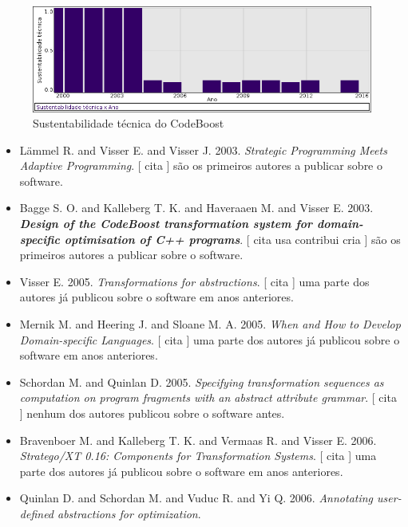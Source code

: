 \begin{figure}[h]
  \center
  \includegraphics[scale=0.50]{result-documents/charts/codeboost.png}
  \caption{Sustentabilidade técnica do CodeBoost}
\end{figure}


\begin{itemize}
\item L\"{a}mmel R. and Visser E. and Visser J.
      2003.
        \textit{ Strategic Programming Meets Adaptive Programming}.
      [
          cita
      ]
são os primeiros autores a publicar sobre o software.
\item Bagge S. O. and Kalleberg T. K. and Haveraaen M. and Visser E.
      2003.
        \textbf{\textit{ Design of the CodeBoost transformation system for domain-specific optimisation of C++ programs}}.
      [
          cita
          usa
          contribui
          cria
      ]
são os primeiros autores a publicar sobre o software.
\item Visser E.
      2005.
        \textit{ Transformations for abstractions}.
      [
          cita
      ]
uma parte dos autores já publicou sobre o software em anos anteriores.
\item Mernik M. and Heering J. and Sloane M. A.
      2005.
        \textit{ When and How to Develop Domain-specific Languages}.
      [
          cita
      ]
uma parte dos autores já publicou sobre o software em anos anteriores.
\item Schordan M. and Quinlan D.
      2005.
        \textit{ Specifying transformation sequences as computation on program fragments with an abstract attribute grammar}.
      [
          cita
      ]
nenhum dos autores publicou sobre o software antes.
\item Bravenboer M. and Kalleberg T. K. and Vermaas R. and Visser E.
      2006.
        \textit{ Stratego/XT 0.16: Components for Transformation Systems}.
      [
          cita
      ]
uma parte dos autores já publicou sobre o software em anos anteriores.
\item Quinlan D. and Schordan M. and Vuduc R. and Yi Q.
      2006.
        \textit{ Annotating user-defined abstractions for optimization}.

\end{itemize}
